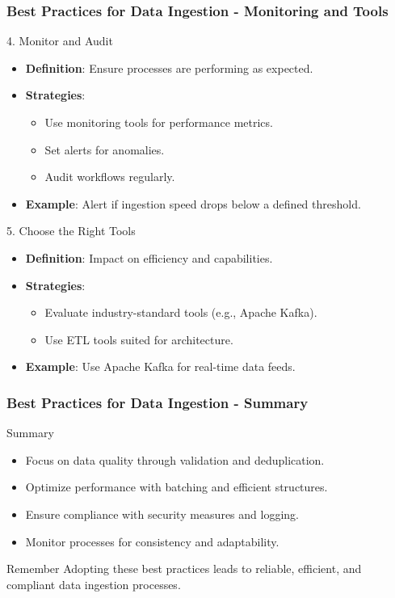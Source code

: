 \documentclass[aspectratio=169]{beamer}
\begin{document}
\begin{frame}[fragile]
    \frametitle{Best Practices for Data Ingestion - Monitoring and Tools}
    \begin{block}{4. Monitor and Audit}
        \begin{itemize}
            \item \textbf{Definition}: Ensure processes are performing as expected.
            \item \textbf{Strategies}:
            \begin{itemize}
                \item Use monitoring tools for performance metrics.
                \item Set alerts for anomalies.
                \item Audit workflows regularly.
            \end{itemize}
            \item \textbf{Example}: Alert if ingestion speed drops below a defined threshold.
        \end{itemize}
    \end{block}

    \begin{block}{5. Choose the Right Tools}
        \begin{itemize}
            \item \textbf{Definition}: Impact on efficiency and capabilities.
            \item \textbf{Strategies}:
            \begin{itemize}
                \item Evaluate industry-standard tools (e.g., Apache Kafka).
                \item Use ETL tools suited for architecture.
            \end{itemize}
            \item \textbf{Example}: Use Apache Kafka for real-time data feeds.
        \end{itemize}
    \end{block}
\end{frame}

\begin{frame}[fragile]
    \frametitle{Best Practices for Data Ingestion - Summary}
    \begin{block}{Summary}
        \begin{itemize}
            \item Focus on data quality through validation and deduplication.
            \item Optimize performance with batching and efficient structures.
            \item Ensure compliance with security measures and logging.
            \item Monitor processes for consistency and adaptability.
        \end{itemize}
    \end{block}
    \begin{block}{Remember}
        Adopting these best practices leads to reliable, efficient, and compliant data ingestion processes.
    \end{block}
\end{frame}
\end{document}
